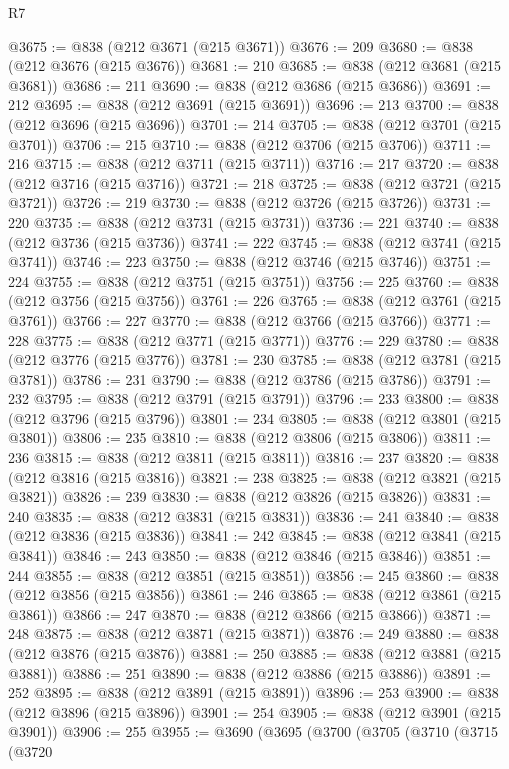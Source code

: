 \begin{lexlean}{R7}
\begin{coremodule}
@3675 := @838 (@212 @3671 (@215 @3671))
@3676 := 209
@3680 := @838 (@212 @3676 (@215 @3676))
@3681 := 210
@3685 := @838 (@212 @3681 (@215 @3681))
@3686 := 211
@3690 := @838 (@212 @3686 (@215 @3686))
@3691 := 212
@3695 := @838 (@212 @3691 (@215 @3691))
@3696 := 213
@3700 := @838 (@212 @3696 (@215 @3696))
@3701 := 214
@3705 := @838 (@212 @3701 (@215 @3701))
@3706 := 215
@3710 := @838 (@212 @3706 (@215 @3706))
@3711 := 216
@3715 := @838 (@212 @3711 (@215 @3711))
@3716 := 217
@3720 := @838 (@212 @3716 (@215 @3716))
@3721 := 218
@3725 := @838 (@212 @3721 (@215 @3721))
@3726 := 219
@3730 := @838 (@212 @3726 (@215 @3726))
@3731 := 220
@3735 := @838 (@212 @3731 (@215 @3731))
@3736 := 221
@3740 := @838 (@212 @3736 (@215 @3736))
@3741 := 222
@3745 := @838 (@212 @3741 (@215 @3741))
@3746 := 223
@3750 := @838 (@212 @3746 (@215 @3746))
@3751 := 224
@3755 := @838 (@212 @3751 (@215 @3751))
@3756 := 225
@3760 := @838 (@212 @3756 (@215 @3756))
@3761 := 226
@3765 := @838 (@212 @3761 (@215 @3761))
@3766 := 227
@3770 := @838 (@212 @3766 (@215 @3766))
@3771 := 228
@3775 := @838 (@212 @3771 (@215 @3771))
@3776 := 229
@3780 := @838 (@212 @3776 (@215 @3776))
@3781 := 230
@3785 := @838 (@212 @3781 (@215 @3781))
@3786 := 231
@3790 := @838 (@212 @3786 (@215 @3786))
@3791 := 232
@3795 := @838 (@212 @3791 (@215 @3791))
@3796 := 233
@3800 := @838 (@212 @3796 (@215 @3796))
@3801 := 234
@3805 := @838 (@212 @3801 (@215 @3801))
@3806 := 235
@3810 := @838 (@212 @3806 (@215 @3806))
@3811 := 236
@3815 := @838 (@212 @3811 (@215 @3811))
@3816 := 237
@3820 := @838 (@212 @3816 (@215 @3816))
@3821 := 238
@3825 := @838 (@212 @3821 (@215 @3821))
@3826 := 239
@3830 := @838 (@212 @3826 (@215 @3826))
@3831 := 240
@3835 := @838 (@212 @3831 (@215 @3831))
@3836 := 241
@3840 := @838 (@212 @3836 (@215 @3836))
@3841 := 242
@3845 := @838 (@212 @3841 (@215 @3841))
@3846 := 243
@3850 := @838 (@212 @3846 (@215 @3846))
@3851 := 244
@3855 := @838 (@212 @3851 (@215 @3851))
@3856 := 245
@3860 := @838 (@212 @3856 (@215 @3856))
@3861 := 246
@3865 := @838 (@212 @3861 (@215 @3861))
@3866 := 247
@3870 := @838 (@212 @3866 (@215 @3866))
@3871 := 248
@3875 := @838 (@212 @3871 (@215 @3871))
@3876 := 249
@3880 := @838 (@212 @3876 (@215 @3876))
@3881 := 250
@3885 := @838 (@212 @3881 (@215 @3881))
@3886 := 251
@3890 := @838 (@212 @3886 (@215 @3886))
@3891 := 252
@3895 := @838 (@212 @3891 (@215 @3891))
@3896 := 253
@3900 := @838 (@212 @3896 (@215 @3896))
@3901 := 254
@3905 := @838 (@212 @3901 (@215 @3901))
@3906 := 255
@3955 := @3690
    (@3695
      (@3700
        (@3705
          (@3710
            (@3715
              (@3720

\end{coremodule}
\end{lexlean}
